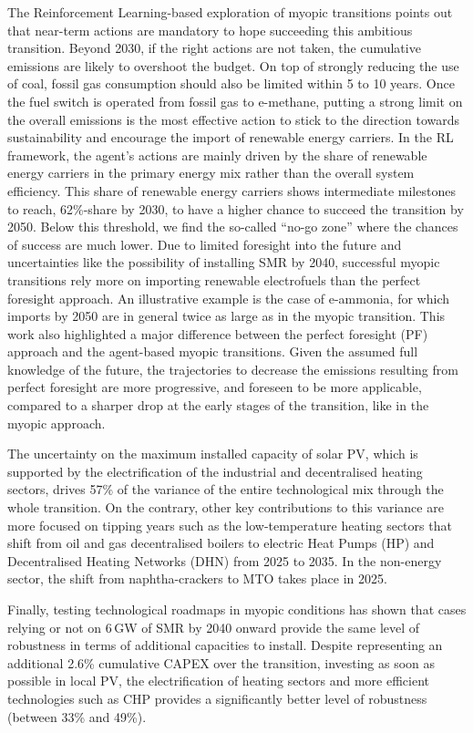 The Reinforcement Learning-based exploration of myopic transitions points out that near-term actions are mandatory to hope succeeding this ambitious transition.  Beyond 2030, if the right actions are not taken, the cumulative emissions are likely to overshoot the  budget. On top of strongly reducing the use of coal, fossil gas consumption should also be limited within 5 to 10 years. Once the fuel switch is operated from fossil gas to e-methane, putting a strong limit on the overall emissions is the most effective action to stick to the direction towards sustainability and encourage the import of renewable energy carriers. In the \gls{RL} framework, the agent's actions are mainly driven by the share of renewable energy carriers in the primary energy mix rather than the overall system efficiency. This share of renewable energy carriers shows intermediate milestones to reach, 62\%-share by 2030, to have a higher chance to succeed the transition by 2050. Below this threshold, we find the so-called ``no-go zone'' where the chances of success are much lower. Due to limited foresight into the future and uncertainties like the possibility of installing \gls{SMR} by 2040, successful myopic transitions rely more on importing renewable electrofuels than the perfect foresight approach. An illustrative example is the case of e-ammonia, for which imports by 2050 are in general twice as large as in the myopic transition. This work also highlighted a major difference between the perfect foresight (PF) approach and the agent-based myopic transitions. Given the assumed full knowledge of the future, the trajectories to decrease the  emissions resulting from perfect foresight are more progressive, and foreseen to be more applicable, compared to a sharper drop at the early stages of the transition, like in the myopic approach.

The uncertainty on the maximum installed capacity of solar \gls{PV}, which is supported by the electrification of the industrial and decentralised heating sectors, drives 57\% of the variance of the entire technological mix through the whole transition. On the contrary, other key contributions to this variance are more focused on tipping years such as the low-temperature heating sectors that shift from oil and gas decentralised boilers to electric Heat Pumps (HP) and Decentralised Heating Networks (DHN) from 2025 to 2035. In the non-energy sector, the shift from naphtha-crackers to \acrfull{MTO} takes place in 2025.

Finally, testing technological roadmaps in myopic conditions has shown that cases relying or not on 6\,GW of \gls{SMR} by 2040 onward provide the same level of robustness in terms of additional capacities to install. Despite representing an additional 2.6\% cumulative CAPEX over the transition, investing as soon as possible in local \gls{PV}, the electrification of heating sectors and more efficient technologies such as \gls{CHP} provides a significantly better level of robustness (between 33\% and 49\%).\\


